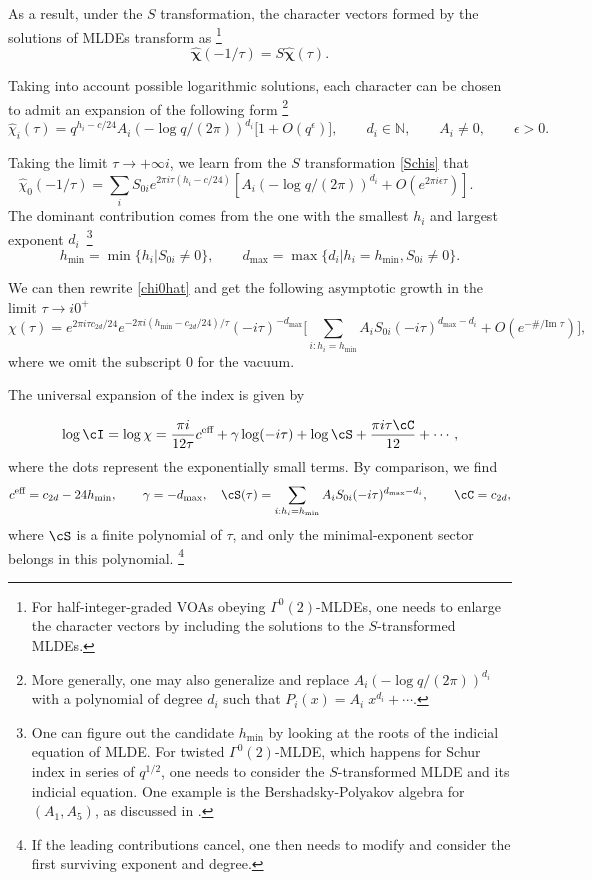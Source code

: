 \documentclass[a4paper,11pt]{article}
\theoremstyle{definition}
\theoremstyle{definition}
\theoremstyle{remark}
\newcommand{\ceff}{c^\text{eff}}
\newcommand{\be}{\begin{equation}}
\newcommand{\ee}{\end{equation}}
\begin{document}
 As a result,  under the $S$ transformation, the character vectors formed by the solutions of MLDEs  transform  as
 \footnote{For half-integer-graded VOAs obeying $\Gamma^0(2)$-MLDEs, one needs to enlarge the character vectors by including the solutions to the $S$-transformed MLDEs.}
  \be\label{Schis}
  \widehat {\bm\chi} (-1/\tau )
= 
S \widehat {\bm\chi}(\tau ).
  \ee
 
Taking into account possible logarithmic solutions, each character   can be chosen to admit  an expansion of the  following     form    
\footnote{More generally, one may also generalize and replace $A_i (-\log q/(2\pi))^{d_i}$ with a polynomial  of degree $d_i$ such that $P_i(x) =A_i \; x^{d_i}+\cdots$.   }
 \be\label{chiiS}
\widehat\chi_i(\tau)=q^{h_i-c/24} A_i (-\log q/(2\pi))^{d_i}\bigl[1+O(q^\epsilon)\bigr],\qquad d_i\in\mathbb N, \qquad A_i \neq 0, \qquad\epsilon>0.
\ee 

 
 
  Taking the limit  $\tau\to   +\infty i  $,  we learn from the $S$ transformation \eqref{Schis}  that
  \be\label{chi0hat}
  \widehat\chi_0(-1/\tau)=\sum_i S_{0i}e^{2\pi i\tau(h_i-c/24)}\left[A_i (-\log q/(2\pi))^{d_i}+O(e^{2\pi i\epsilon\tau})\right].\qquad  
    \ee 
   The  dominant contribution comes from  the one with the smallest $h_i$ and largest exponent $d_i$~\footnote{One can    figure out the candidate $ h_{\text{min}}$ by looking at the roots of the indicial equation of  MLDE. For twisted $\Gamma^0(2)$-MLDE, which happens for Schur index in series of $q^{1/2}$, one needs to consider the $S$-transformed MLDE and its indicial equation.  One example is the  Bershadsky-Polyakov algebra for $(A_1,A_5)$, as discussed in \cite{Beem:2017ooy}. }
    \be
 h_{\text{min}}=\min\{h_i | S_{0i}\neq 0 \},\qquad  d_{\text{max}}=\max\{d_i | h_i =h_{\text{min}}, S_{0i}\neq 0\}.
 \ee
 
 
We can then rewrite \eqref{chi0hat}  and get the following asymptotic growth    in the limit $\tau \to i 0^+$ 
 \be
 \chi (\tau) =e^{2\pi i \tau c_{2d}/24} e^{-2\pi i  (h_ \text{min}-c_{2d}/24)/\tau} (-i\tau)^{-d_{\max}}
 \Big[\sum_{i:h_i=h_ {\min}}    A_i S_{0i}   (-i\tau)^{d_\text{max}-d_i} +O(e^{-\#/\text{Im }   \tau})\Big] ,
 \ee
 where we omit the subscript 0 for the vacuum. 
 
   The universal expansion of the index is given by
  
 \be\label{asymI}
\log\cI=\log\chi= {\frac{\pi i}{12\tau}}c^\text{eff}+\gamma \log(-i \tau)+\log \cS+\frac{\pi i \tau\cC}{12}+\cdots,
\ee
where the dots represent the exponentially small terms.  By comparison, we find
\be
\ceff=c_{2d}- 24h_{\text{min}}, \qquad \gamma=-d_{\text{max}}, \quad 
\cS(\tau)= \sum_{i:h_i=h_{\text{min}}}  A_i S_{0i}   (-i\tau)^{d_{\text{max}}-d_i}, \qquad
\cC=c_{2d},
\ee
where $\cS$ is a finite polynomial of $\tau$, and only the minimal-exponent sector belongs in this polynomial. \footnote{If the leading contributions cancel, one then needs to modify and consider the first surviving exponent and degree. 
}
 
\end{document}

